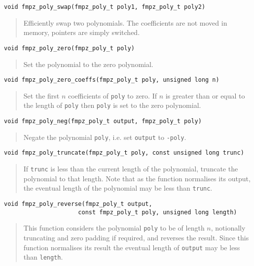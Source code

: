 \documentclass[a4paper,10pt]{article}
\newcommand{\code}{\lstinline}
\begin{document}
\begin{lstlisting}
void fmpz_poly_swap(fmpz_poly_t poly1, fmpz_poly_t poly2)
\end{lstlisting}
\begin{quote}
Efficiently swap two polynomials. The coefficients are not moved in memory, pointers are simply switched. \end{quote}

\begin{lstlisting}
void fmpz_poly_zero(fmpz_poly_t poly) 
\end{lstlisting}
\begin{quote}
Set the polynomial to the zero polynomial.
\end{quote}

\begin{lstlisting}
void fmpz_poly_zero_coeffs(fmpz_poly_t poly, unsigned long n) 
\end{lstlisting}
\begin{quote}
Set the first $n$ coefficients of \code{poly} to zero. If $n$ is greater than or equal to the length of \code{poly} then \code{poly} is set to the zero polynomial.
\end{quote}

\begin{lstlisting}
void fmpz_poly_neg(fmpz_poly_t output, fmpz_poly_t poly) 
\end{lstlisting}
\begin{quote}
Negate the polynomial \code{poly}, i.e. set \code{output} to \code{-poly}.
\end{quote}

\begin{lstlisting}
void fmpz_poly_truncate(fmpz_poly_t poly, const unsigned long trunc)
\end{lstlisting}
\begin{quote}
If \code{trunc} is less than the current length of the polynomial, truncate the polynomial to that length. Note that as the function normalises its output, the eventual length of the polynomial may be less than \code{trunc}.
\end{quote}

\begin{lstlisting}
void fmpz_poly_reverse(fmpz_poly_t output, 
                     const fmpz_poly_t poly, unsigned long length) 
\end{lstlisting}
\begin{quote}
This function considers the polynomial \code{poly} to be of length $n$, notionally truncating and zero padding if required, and reverses the result. Since this function normalises its result the eventual length of \code{output} may be less than \code{length}.
\end{quote}
\end{document}
